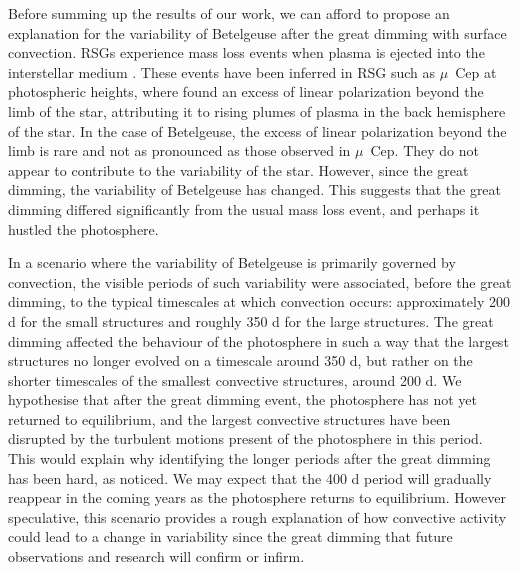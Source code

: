 \documentclass{aa}
\begin{document}
Before summing up the results of our work, we can afford to propose an explanation for the variability of Betelgeuse after the great dimming with surface convection. RSGs experience mass loss events when plasma is ejected into the interstellar medium \citep{josselin_atmospheric_2007}. 
These events have been inferred in RSG such as $\mu$~Cep at photospheric heights, where \cite{lopez_ariste_height_2023} found an excess of linear polarization beyond the limb of the star, attributing it to rising plumes of plasma in the back hemisphere of the star. 
In the case of Betelgeuse, the excess of linear polarization beyond the limb is rare and not as pronounced as those observed in $\mu$~Cep. They do not appear to contribute to 
 the variability of the star. However, since the great dimming, the variability of Betelgeuse has changed. This suggests that the great dimming differed significantly from the usual mass loss event, and perhaps it hustled the  photosphere. \

In a scenario where the variability of Betelgeuse is primarily governed by convection,  the visible periods of such variability  were associated, before the great dimming, to the 
typical timescales at which convection occurs: approximately 200 d for the small structures and roughly 350 d for the large structures. The great dimming affected the behaviour of the photosphere in such a way that the largest structures 
no longer evolved on a timescale around 350 d, but rather on the shorter timescales of the smallest convective structures, around 200 d. We hypothesise that after the great dimming event, the photosphere has not yet returned to equilibrium, and the largest convective structures 
have been disrupted by the turbulent motions present of the photosphere in this period. This would explain why identifying the longer periods after the great dimming has been hard, as \cite{dupree_great_2022} noticed. We may expect that the 400 d 
period will gradually reappear in the coming years as the photosphere returns to equilibrium. However speculative, this scenario 
provides a rough explanation of how convective activity could lead to a change in variability since the great dimming that future observations and 
research will confirm or infirm.
\end{document}
